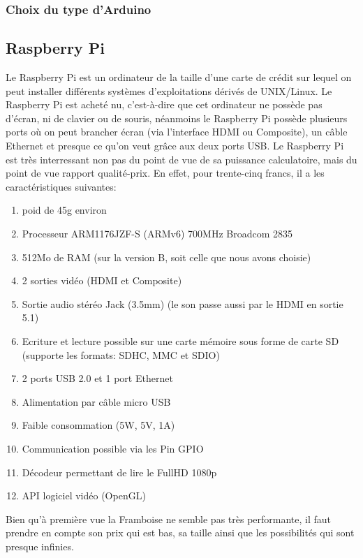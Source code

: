 \documentclass[a4paper,12pt]{article}
\begin{document}
{\subsubsection{Choix du type d'Arduino}



\subsection{Raspberry Pi}
Le Raspberry Pi\cite{RaspberryPiCaracteristiques} est un ordinateur de la taille d'une carte de crédit sur lequel on peut installer différents systèmes d'exploitations dérivés de UNIX/Linux. Le Raspberry Pi est acheté nu, c'est-à-dire que cet ordinateur ne possède pas d'écran, ni de clavier ou de souris, néanmoins le Raspberry Pi possède plusieurs ports où on peut brancher écran (via l'interface HDMI ou Composite), un câble Ethernet et presque ce qu'on veut grâce aux deux ports USB. Le Raspberry Pi est très interressant non pas du point de vue de sa puissance calculatoire, mais du point de vue rapport qualité-prix. En effet, pour trente-cinq francs, il a les caractéristiques suivantes: 
\begin{enumerate}
\item poid de 45g environ
\item Processeur ARM1176JZF-S (ARMv6) 700MHz Broadcom 2835
\item 512Mo de RAM (sur la version B, soit celle que nous avons choisie)
\item 2 sorties vidéo (HDMI et Composite) 
\item Sortie audio stéréo Jack (3.5mm) (le son passe aussi par le HDMI en sortie 5.1)
\item Ecriture et lecture possible sur une carte mémoire sous forme de carte SD (supporte les formats: SDHC, MMC et SDIO)
\item 2 ports USB 2.0 et 1 port Ethernet
\item Alimentation par câble micro USB
\item Faible consommation (5W, 5V, 1A)
\item Communication possible via les Pin GPIO
\item Décodeur permettant de lire le FullHD  1080p
\item API logiciel vidéo (OpenGL)
\end{enumerate}
Bien qu'à première vue la Framboise ne semble pas très performante, il faut prendre en compte son prix qui est bas, sa taille ainsi que les possibilités qui sont presque infinies.

}
\end{document}
